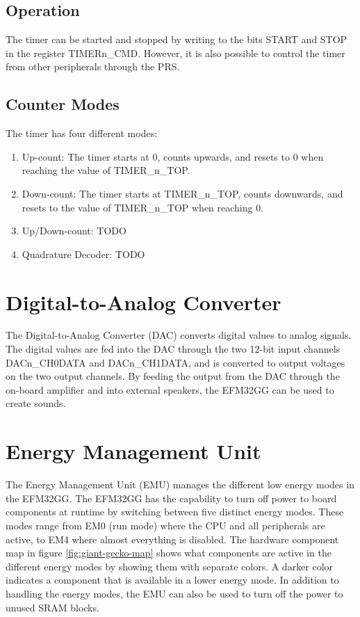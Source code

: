 \subsection{Operation}
The timer can be started and stopped by writing to the bits START and STOP in the register TIMERn\_CMD. However, it is also possible to control the timer from other peripherals through the PRS.

\subsection{Counter Modes}
The timer has four different modes:
\begin{enumerate}
	\item Up-count: The timer starts at 0, counts upwards, and resets to 0 when reaching the value of TIMER\_n\_TOP.
	\item Down-count: The timer starts at TIMER\_n\_TOP, counts downwards, and resets to the value of TIMER\_n\_TOP when reaching 0.

	\item Up/Down-count: TODO %
	\item Quadrature Decoder: TODO %
\end{enumerate}


\section{Digital-to-Analog Converter}
The Digital-to-Analog Converter (DAC) converts digital values to analog signals. The digital values are fed into the DAC through the two 12-bit input channels DACn\_CH0DATA and DACn\_CH1DATA, and is converted to output voltages on the two output channels. By feeding the output from the DAC through the on-board amplifier and into external speakers, the EFM32GG can be used to create sounds.


\section{Energy Management Unit}\label{sec:emu}
The Energy Management Unit (EMU) manages the different low energy modes in the EFM32GG. The EFM32GG has the capability to turn off power to board components at runtime by switching between five distinct energy modes. These modes range from EM0 (run mode) where the CPU and all peripherals are active, to EM4 where almost everything is disabled. The hardware component map in figure \ref{fig:giant-gecko-map} shows what components are active in the different energy modes by showing them with separate colors. A darker color indicates a component that is available in a lower energy mode. In addition to handling the energy modes, the EMU can also be used to turn off the power to unused SRAM blocks.\cite{efm32gg-rm}


